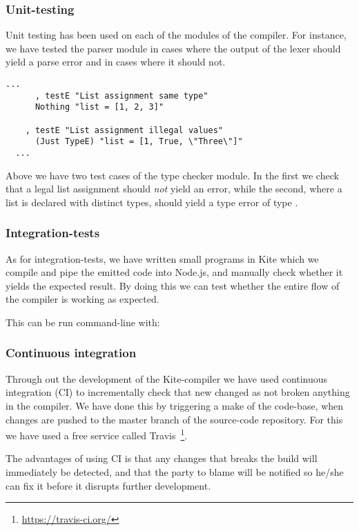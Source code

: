 \subsubsection{Unit-testing}
Unit testing has been used on each of the modules of the
compiler. For instance, we have tested the parser module in cases
where the output of the lexer should yield a parse error and in cases
where it should not.

\begin{lstlisting}[caption=\code{Kite.Test.TypeCheck.hs} snippet]
  ...
      , testE "List assignment same type"
      Nothing "list = [1, 2, 3]"

    , testE "List assignment illegal values"
      (Just TypeE) "list = [1, True, \"Three\"]"
  ...
\end{lstlisting}

Above we have two test cases of the type checker module. In the first
we check that a legal list assignment should \emph{not} yield an
error, while the second, where a list is declared with distinct types,
should yield a type error of type .

\subsubsection{Integration-tests}
As for integration-tests, we have written small programs in Kite which
we compile and pipe the emitted code into Node.js, and manually check
whether it yields the expected result. By doing this we can test
whether the entire flow of the compiler is working as expected.

This can be run command-line with: 

\subsubsection{Continuous integration}
Through out the development of the Kite-compiler we have used
continuous integration (CI) to incrementally check that new changed as
not broken anything in the compiler. We have done this by triggering a
make of the code-base, when changes are pushed to the master branch of
the source-code repository. For this we have used a free service
called Travis~\footnote{\url{https://travis-ci.org/}}.

The advantages of using CI is that any changes that breaks the build
will immediately be detected, and that the party to blame will be
notified so he/she can fix it before it disrupts further development.


